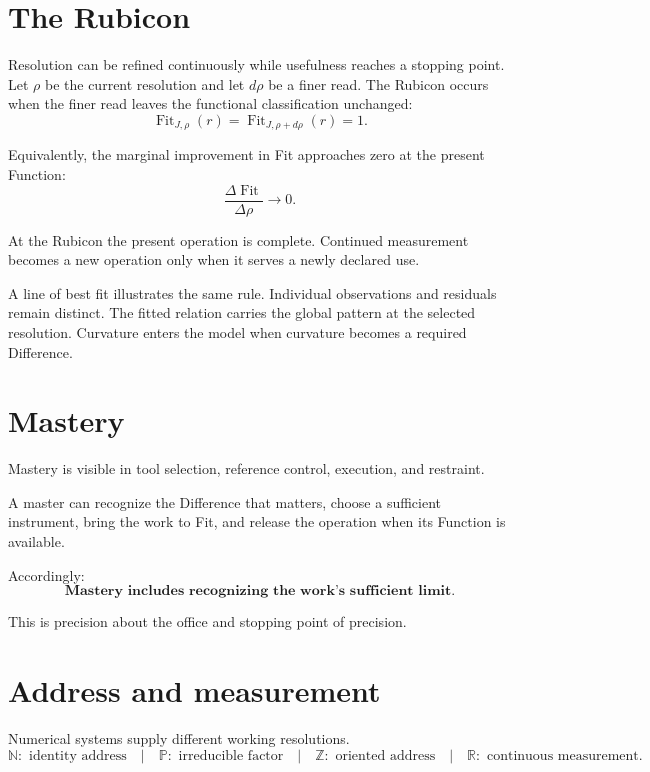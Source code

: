 \documentclass[10pt]{article}
\newcommand{\fit}{\operatorname{Fit}}
\begin{document}
\section{The Rubicon}

Resolution can be refined continuously while usefulness reaches a stopping point. Let $\rho$ be the current resolution and let $d\rho$ be a finer read. The Rubicon occurs when the finer read leaves the functional classification unchanged:
\[
\boxed{\fit_{J,\rho}(r)=\fit_{J,\rho+d\rho}(r)=1.}
\]

Equivalently, the marginal improvement in Fit approaches zero at the present Function:
\[
\frac{\Delta\fit}{\Delta\rho}\longrightarrow 0.
\]

At the Rubicon the present operation is complete. Continued measurement becomes a new operation only when it serves a newly declared use.

A line of best fit illustrates the same rule. Individual observations and residuals remain distinct. The fitted relation carries the global pattern at the selected resolution. Curvature enters the model when curvature becomes a required Difference.

\begin{center}
\end{center}

\section{Mastery}

Mastery is visible in tool selection, reference control, execution, and restraint.

A master can recognize the Difference that matters, choose a sufficient instrument, bring the work to Fit, and release the operation when its Function is available.

Accordingly:
\[
\boxed{\textbf{Mastery includes recognizing the work's sufficient limit.}}
\]

This is precision about the office and stopping point of precision.

\section{Address and measurement}

Numerical systems supply different working resolutions.
\[
\boxed{
\mathbb N:\text{ identity address}
\quad | \quad
\mathbb P:\text{ irreducible factor}
\quad | \quad
\mathbb Z:\text{ oriented address}
\quad | \quad
\mathbb R:\text{ continuous measurement}.}
\]
\end{document}
